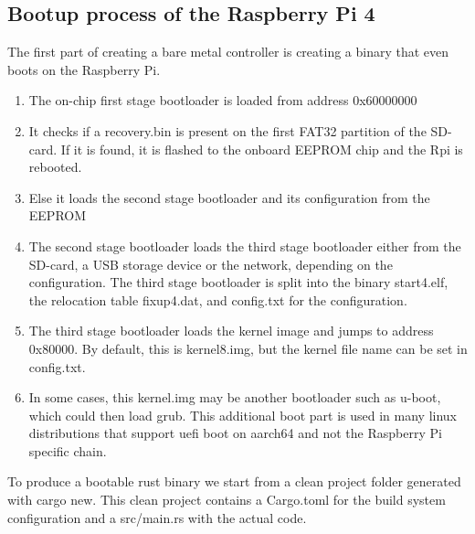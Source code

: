\subsection{Bootup process of the Raspberry Pi 4}
\label{sec:concept_and_implementation:bare-metal:boot}

The first part of creating a bare metal controller is creating a binary that even boots on the Raspberry Pi.
\begin{enumerate}
    \item The on-chip first stage bootloader is loaded from address 0x60000000
    \item It checks if a recovery.bin is present on the first FAT32 partition of the SD-card. If it is found, it is flashed to the onboard EEPROM chip and the Rpi is rebooted.
    \item Else it loads the second stage bootloader and its configuration from the EEPROM
    \item The second stage bootloader loads the third stage bootloader either from the SD-card, a USB storage device or the network, depending on the configuration.
          The third stage bootloader is split into the binary start4.elf, the relocation table fixup4.dat, and config.txt for the configuration.
    \item The third stage bootloader loads the kernel image and jumps to address 0x80000. By default, this is kernel8.img, but the kernel file name can be set in config.txt.
    \item In some cases, this kernel.img may be another bootloader such as u-boot, which could then load grub.
          This additional boot part is used in many linux distributions that support uefi boot on aarch64 and not the Raspberry Pi specific chain.
\end{enumerate}

To produce a bootable rust binary we start from a clean project folder generated with cargo new.
This clean project contains a Cargo.toml for the build system configuration and a src/main.rs with the actual code.

